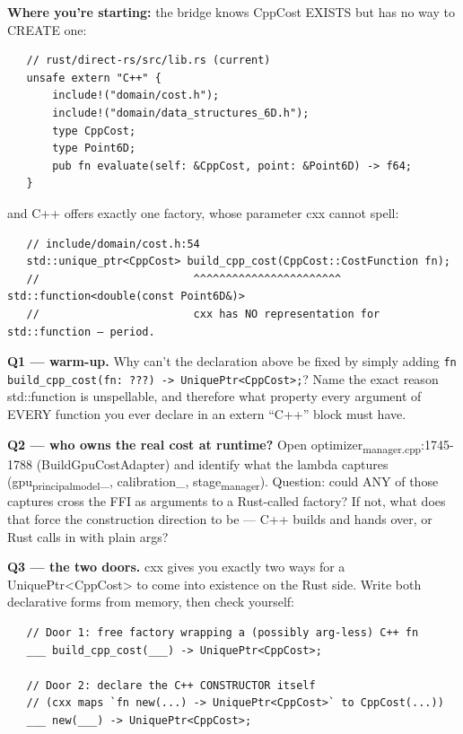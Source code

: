 \documentclass[11pt]{article}
\begin{document}
\textbf{Where you're starting:} the bridge knows CppCost EXISTS but has no way
to CREATE one:

\begin{verbatim}
   // rust/direct-rs/src/lib.rs (current)
   unsafe extern "C++" {
       include!("domain/cost.h");
       include!("domain/data_structures_6D.h");
       type CppCost;
       type Point6D;
       pub fn evaluate(self: &CppCost, point: &Point6D) -> f64;
   }
\end{verbatim}

and C++ offers exactly one factory, whose parameter cxx cannot spell:

\begin{verbatim}
   // include/domain/cost.h:54
   std::unique_ptr<CppCost> build_cpp_cost(CppCost::CostFunction fn);
   //                        ^^^^^^^^^^^^^^^^^^^^^^^ std::function<double(const Point6D&)>
   //                        cxx has NO representation for std::function — period.
\end{verbatim}

\textbf{Q1 — warm-up.} Why can't the declaration above be fixed by simply
adding \texttt{fn build\_cpp\_cost(fn: ???) -> UniquePtr<CppCost>;}? Name the
exact reason std::function is unspellable, and therefore what property
every argument of EVERY function you ever declare in an extern ``C++''
block must have.

\textbf{Q2 — who owns the real cost at runtime?} Open
optimizer\textsubscript{manager.cpp}:1745-1788 (BuildGpuCostAdapter) and identify
what the lambda captures (gpu\textsubscript{principal}\textsubscript{model}\_, calibration\_,
stage\textsubscript{manager}). Question: could ANY of those captures cross the FFI as
arguments to a Rust-called factory? If not, what does that force the
construction direction to be — C++ builds and hands over, or Rust calls
in with plain args?

\textbf{Q3 — the two doors.} cxx gives you exactly two ways for a
UniquePtr<CppCost> to come into existence on the Rust side. Write both
declarative forms from memory, then check yourself:

\begin{verbatim}
   // Door 1: free factory wrapping a (possibly arg-less) C++ fn
   ___ build_cpp_cost(___) -> UniquePtr<CppCost>;

   // Door 2: declare the C++ CONSTRUCTOR itself
   // (cxx maps `fn new(...) -> UniquePtr<CppCost>` to CppCost(...))
   ___ new(___) -> UniquePtr<CppCost>;
\end{verbatim}
\end{document}
